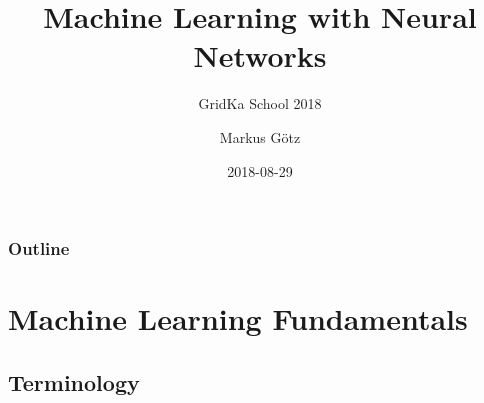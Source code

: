 \documentclass[aspectratio=169]{beamer}
\title{Machine Learning with Neural Networks}
\subtitle{GridKa School 2018}
\author{Markus Götz}
\date{2018-08-29}
\institute{KIT}
\begin{document}
\maketitle

\begin{frame}
\frametitle{Outline}
    \tableofcontents[hideallsubsections]
\end{frame}

\section{Machine Learning Fundamentals}
\label{sec:machine-learning}

\subsection{Terminology}
\label{subsec:terminology}
\end{document}
